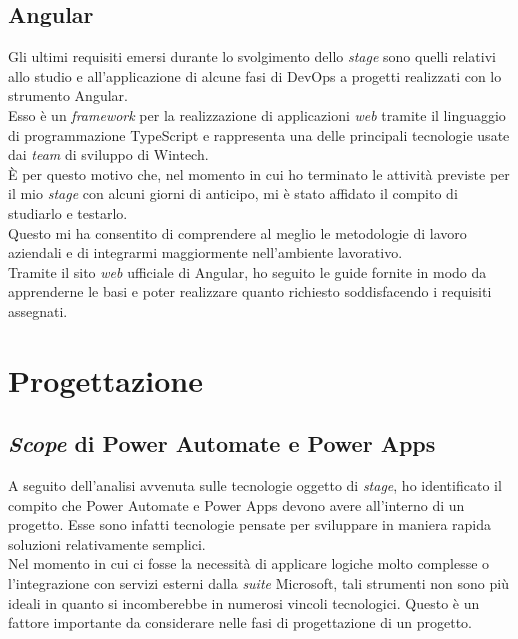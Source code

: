\subsection{Angular}
Gli ultimi requisiti emersi durante lo svolgimento dello \emph{stage} sono quelli relativi allo studio e all'applicazione di alcune fasi di \gls{DevOps} a progetti realizzati con lo strumento Angular.\\
Esso è un \emph{framework} per la realizzazione di applicazioni \emph{web} tramite il linguaggio di programmazione TypeScript e rappresenta una delle principali tecnologie usate dai \emph{team} di sviluppo di Wintech.\\
È per questo motivo che, nel momento in cui ho terminato le attività previste per il mio \emph{stage} con alcuni giorni di anticipo, mi è stato affidato il compito di studiarlo e testarlo.\\
Questo mi ha consentito di comprendere al meglio le metodologie di lavoro aziendali e di integrarmi maggiormente nell'ambiente lavorativo.\\
Tramite il sito \emph{web} ufficiale di Angular, ho seguito le guide fornite in modo da apprenderne le basi e poter realizzare quanto richiesto soddisfacendo i requisiti assegnati.\\

\section{Progettazione}
\subsection{\emph{Scope} di Power Automate e Power Apps}
A seguito dell'analisi avvenuta sulle tecnologie oggetto di \emph{stage}, ho identificato il compito che Power Automate e Power Apps devono avere all'interno di un progetto. 
Esse sono infatti tecnologie pensate per sviluppare in maniera rapida soluzioni relativamente semplici.\\
Nel momento in cui ci fosse la necessità di applicare logiche molto complesse o l'integrazione con servizi esterni dalla \emph{suite} Microsoft, tali strumenti non sono più ideali in quanto si incomberebbe in numerosi vincoli tecnologici.
Questo è un fattore importante da considerare nelle fasi di progettazione di un progetto.\\

